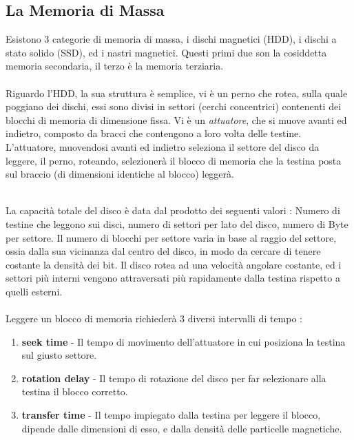 \documentclass[12pt, letterpaper]{article}
\newcommand{\acc}{\\\hphantom{}\\}
\begin{document}
\subsection{La Memoria di Massa}
Esistono 3 categorie di memoria di massa, i dischi magnetici (HDD), i dischi a stato solido (SSD), ed i nastri magnetici. 
Questi primi due son la cosiddetta memoria secondaria, il terzo è la memoria terziaria.\acc

Riguardo l'HDD, la sua struttura è semplice, vi è un perno che rotea, sulla quale poggiano dei dischi, essi sono divisi in settori (cerchi 
concentrici) contenenti dei blocchi di memoria di dimensione fissa. Vi è un \textit{attuatore}, che si muove avanti ed indietro, 
composto da bracci che contengono a loro volta delle testine. L'attuatore, muovendosi avanti ed indietro seleziona il settore del 
disco da leggere, il perno, roteando, selezionerà il blocco di memoria che la testina posta sul braccio (di dimensioni 
identiche al blocco) leggerà.
\begin{figure}[h]
\end{figure}\\
La capacità totale del disco è data dal prodotto dei seguenti valori : Numero di testine che leggono sui disci, 
numero di settori per lato del disco, numero di Byte per settore. Il numero di blocchi per settore varia in base al 
raggio del settore, ossia dalla sua vicinanza dal centro del disco, in modo da cercare di tenere costante la 
densità dei bit. Il disco rotea ad una velocità angolare costante, ed i settori più interni vengono attraversati 
più rapidamente dalla testina rispetto a quelli esterni.\acc Leggere un blocco di memoria richiederà 3 diversi intervalli di tempo :\begin{enumerate}
    \item \textbf{seek time }- Il tempo di movimento dell'attuatore in cui posiziona la testina sul giusto settore.
    \item \textbf{rotation delay} - Il tempo di rotazione del disco per far selezionare alla testina il blocco corretto.
    \item \textbf{transfer time} - Il tempo impiegato dalla testina per leggere il blocco, dipende dalle dimensioni di esso, 
    e dalla densità delle particelle magnetiche.
\end{enumerate}
\end{document}
